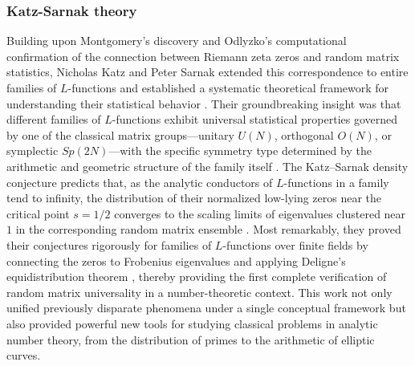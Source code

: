 \documentclass{article}
\begin{document}
   \subsubsection{Katz-Sarnak theory}\label{sectKS} Building upon Montgomery's discovery  and Odlyzko's 
computational confirmation  of the connection 
between Riemann zeta zeros and random matrix statistics, Nicholas Katz and 
Peter Sarnak extended this correspondence to entire families of $L$-functions 
and established a systematic theoretical framework for understanding their 
statistical behavior \cite{KatzSarnakBook,KatzSarnakBull}. Their 
groundbreaking insight was that different families of $L$-functions exhibit 
universal statistical properties governed by one of the classical matrix 
groups---unitary $U(N)$, orthogonal $O(N)$, or symplectic $Sp(2N)$---with the 
specific symmetry type determined by the arithmetic and geometric structure of 
the family itself \cite{KatzSarnakBook,Duenez2004}. The Katz--Sarnak density 
conjecture predicts that, as the analytic conductors of $L$-functions in a 
family tend to infinity, the distribution of their normalized low-lying zeros 
near the critical point $s = 1/2$ converges to the scaling limits of 
eigenvalues clustered near $1$ in the corresponding random matrix ensemble 
\cite{KatzSarnakBook,KatzSarnakBull,KeatingSnaith2000}. Most remarkably, 
they proved their conjectures rigorously for families of $L$-functions over 
finite fields by connecting the zeros to Frobenius eigenvalues and applying 
Deligne's equidistribution theorem \cite{KatzSarnakBook,GordonSarnak1990,
DeligneWeilI,DeligneWeilII}, thereby providing the first complete verification 
of random matrix universality in a number-theoretic context. This work not only 
unified previously disparate phenomena under a single conceptual framework but 
also provided powerful new tools for studying classical problems in analytic 
number theory, from the distribution of primes to the arithmetic of elliptic 
curves.
\end{document}
